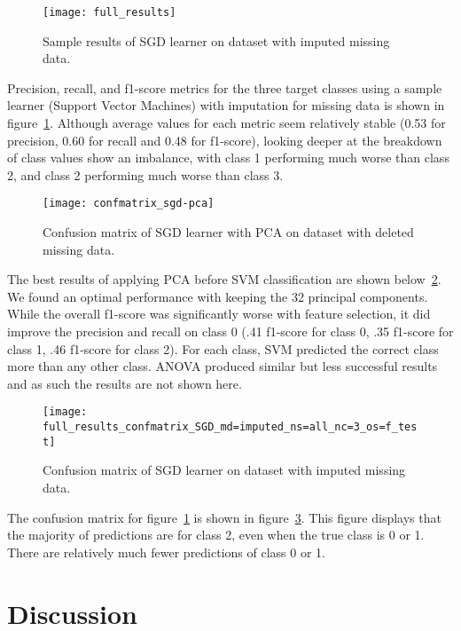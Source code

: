 \documentclass[conference]{IEEEtran}
\begin{document}
\begin{figure}[htpb]
	\centering
	\texttt{[image: full\_results]}
	\caption{Sample results of SGD learner on dataset with imputed missing data.}
	\label{fig:full_results}
\end{figure}

Precision, recall, and f1-score metrics for the three target classes using a sample learner (Support Vector Machines) with imputation for missing data is shown in figure~\ref{fig:full_results}. Although average values for each metric seem relatively stable (0.53 for precision, 0.60 for recall and 0.48 for f1-score), looking deeper at the breakdown of class values show an imbalance, with class 1 performing much worse than class 2, and class 2 performing much worse than class 3.

\begin{figure}[htpb]
	\centering
	\texttt{[image: confmatrix\_sgd-pca]}
	\caption{Confusion matrix of SGD learner with PCA on dataset with deleted missing data.}
	\label{fig:sgd_pca_results}
\end{figure}

The best results of applying PCA before SVM classification are shown below~\ref{fig:sgd_pca_results}. We found an optimal performance with keeping the 32 principal components. While the overall f1-score was significantly worse with feature selection, it did improve the precision and recall on class 0 (.41 f1-score for class 0, .35 f1-score for class 1, .46 f1-score for class 2). For each class, SVM predicted the correct class more than any other class. ANOVA produced similar but less successful results and as such the results are not shown here.

\begin{figure}[htpb]
	\centering
	\texttt{[image: full\_results\_confmatrix\_SGD\_md=imputed\_ns=all\_nc=3\_os=f\_test]}
	\caption{Confusion matrix of SGD learner on dataset with imputed missing data.}
	\label{fig:full_results_cm}
\end{figure}

The confusion matrix for figure~\ref{fig:full_results} is shown in figure~\ref{fig:full_results_cm}. This figure displays that the majority of predictions are for class 2, even when the true class is 0 or 1. There are relatively much fewer predictions of class 0 or 1.

\section{Discussion}
\end{document}
